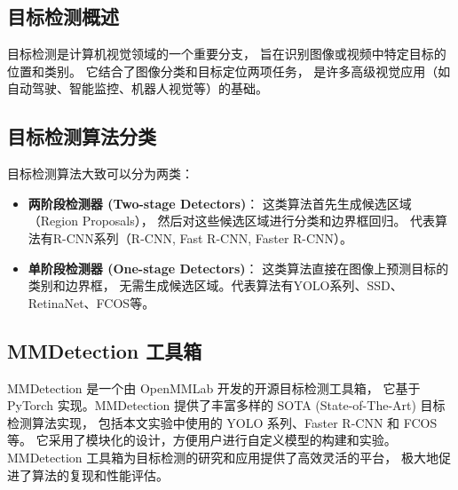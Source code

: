 \subsection{目标检测概述}
目标检测是计算机视觉领域的一个重要分支，
旨在识别图像或视频中特定目标的位置和类别。
它结合了图像分类和目标定位两项任务，
是许多高级视觉应用（如自动驾驶、智能监控、机器人视觉等）的基础。

\subsection{目标检测算法分类}
目标检测算法大致可以分为两类：
\begin{itemize}
    \item \textbf{两阶段检测器 (Two-stage Detectors)}：
    这类算法首先生成候选区域（Region Proposals），
    然后对这些候选区域进行分类和边界框回归。
    代表算法有R-CNN系列（R-CNN, Fast R-CNN, Faster R-CNN）。
    \item \textbf{单阶段检测器 (One-stage Detectors)}：
    这类算法直接在图像上预测目标的类别和边界框，
    无需生成候选区域。代表算法有YOLO系列、SSD、RetinaNet、FCOS等。
\end{itemize}
\subsection{MMDetection 工具箱}
MMDetection 是一个由 OpenMMLab 开发的开源目标检测工具箱，
它基于 PyTorch 实现。MMDetection 提供了丰富多样的 SOTA (State-of-The-Art) 目标检测算法实现，
包括本文实验中使用的 YOLO 系列、Faster R-CNN 和 FCOS 等。
它采用了模块化的设计，方便用户进行自定义模型的构建和实验。
MMDetection 工具箱为目标检测的研究和应用提供了高效灵活的平台，
极大地促进了算法的复现和性能评估。

